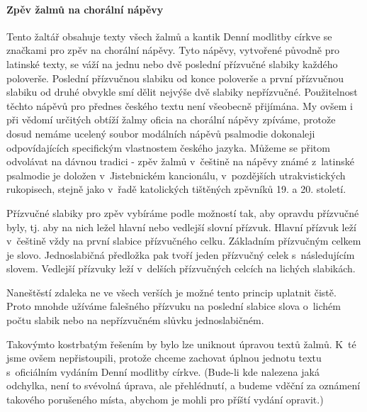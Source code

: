 \documentclass[a5paper, twoside]{article}
\begin{document}
\pagestyle{empty}

\patitulSvazkuAntifonare

\newpage

\frontispisSvazkuAntifonare

\newpage

\titulniStrankaSvazkuAntifonare

\cleardoublepage


\paragraph{Zpěv žalmů na chorální nápěvy}
Tento žaltář obsahuje texty všech žalmů a kantik Denní modlitby církve
se značkami pro zpěv na chorální nápěvy.
Tyto nápěvy, vytvořené původně pro latinské texty, se váží na jednu nebo dvě 
poslední přízvučné slabiky každého poloverše. Poslední přízvučnou slabiku
od konce poloverše a první přízvučnou slabiku od druhé obvykle smí dělit
nejvýše dvě slabiky nepřízvučné.
Použitelnost těchto nápěvů pro přednes českého textu není všeobecně přijímána.
My ovšem i při vědomí určitých obtíží žalmy oficia na 
chorální nápěvy zpíváme, protože dosud nemáme ucelený soubor modálních
nápěvů psalmodie dokonaleji odpovídajících specifickým vlastnostem českého
jazyka.
Můžeme se přitom odvolávat na dávnou tradici - zpěv žalmů v~češtině na nápěvy
známé z~latinské psalmodie je doložen v~Jistebnickém kancionálu,
v~pozdějších utrakvistických rukopisech, stejně jako v~řadě katolických
tištěných zpěvníků 19. a 20. století.

Přízvučné slabiky pro zpěv vybíráme podle možností tak, aby opravdu
přízvučné byly, tj. aby na nich ležel hlavní nebo vedlejší slovní přízvuk.
Hlavní přízvuk leží v~češtině vždy na první slabice přízvučného celku.
Základním přízvučným celkem je slovo. Jednoslabičná předložka pak tvoří jeden 
přízvučný
celek s~následujícím slovem. Vedlejší přízvuky leží v~delších přízvučných celcích
na lichých slabikách.

Naneštěstí zdaleka ne ve všech verších je možné tento princip uplatnit čistě.
Proto mnohde užíváme falešného přízvuku na poslední slabice slova
o~lichém počtu slabik nebo na nepřízvučném slůvku jednoslabičném.

Takovýmto kostrbatým řešením by bylo lze uniknout úpravou textů žalmů.
K~té jsme ovšem nepřistoupili, protože chceme zachovat úplnou jednotu
textu s~oficiálním vydáním Denní modlitby církve.
(Bude-li kde nalezena jaká odchylka, není to svévolná úprava, ale přehlédnutí,
a budeme vděční za oznámení takového porušeného místa, abychom je mohli 
pro příští vydání opravit.)
\end{document}
